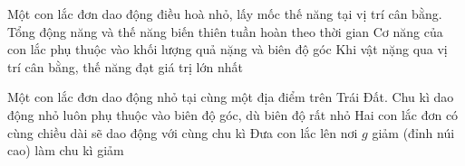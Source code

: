 \begin{ex}
Một con lắc đơn dao động điều hoà nhỏ, lấy mốc thế năng tại vị trí cân bằng.
{Tổng động năng và thế năng biến thiên tuần hoàn theo thời gian}
{\True Cơ năng của con lắc phụ thuộc vào khối lượng quả nặng và biên độ góc}
{Khi vật nặng qua vị trí cân bằng, thế năng đạt giá trị lớn nhất}
\end{ex}
\begin{ex}
Một con lắc đơn dao động nhỏ tại cùng một địa điểm trên Trái Đất.
{Chu kì dao động nhỏ luôn phụ thuộc vào biên độ góc, dù biên độ rất nhỏ}
{\True Hai con lắc đơn có cùng chiều dài sẽ dao động với cùng chu kì}
{Đưa con lắc lên nơi $g$ giảm (đỉnh núi cao) làm chu kì giảm}
\end{ex}
